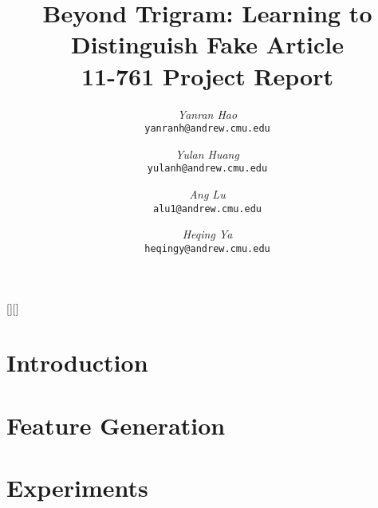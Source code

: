 \documentclass[12pt,twocolumn]{article}
\begin{document}
[][\FBwidth]
\newcommand{\beq}{\begin{equation}}
\newcommand{\eeq}{\end{equation}}
\newcommand{\bit}{\begin{itemize*}}
\newcommand{\eit}{\end{itemize*}}
\newcommand{\goal}[1]{ {\noindent {$\Rightarrow$} \em {#1} } }
\newcommand{\hide}[1]{}
\newcommand{\comment}[1]{ {\footnotesize {#1} } }
\newtheorem{lemma}{Lemma}
\newtheorem{theorem}{Theorem}
\newtheorem{proof}{Proof}
\newtheorem{defn}{Definition}
\newtheorem{algo}{Algorithm}
\newtheorem{observation}{Observation}

\title{Beyond Trigram: Learning to Distinguish Fake Article\\11-761 Project Report}


\author{ 
	{\em Yanran Hao} \\
	    {\tt yanranh@andrew.cmu.edu}
	 \and
	 {\em Yulan Huang} \\
	    {\tt yulanh@andrew.cmu.edu}
	  \and  
	{\em Ang Lu} \\
	    {\tt alu1@andrew.cmu.edu}
	 \and
	 {\em Heqing Ya} \\
	     {\tt heqingy@andrew.cmu.edu}
        }


\maketitle
\begin{abstract}
    
\end{abstract}

\section{Introduction}
    \label{sec:intro}
    

\section{Feature Generation}
    \label{sec:feature}
    
    
%   


\section{Experiments}
    \label{sec:experiments}
    
\end{document}

